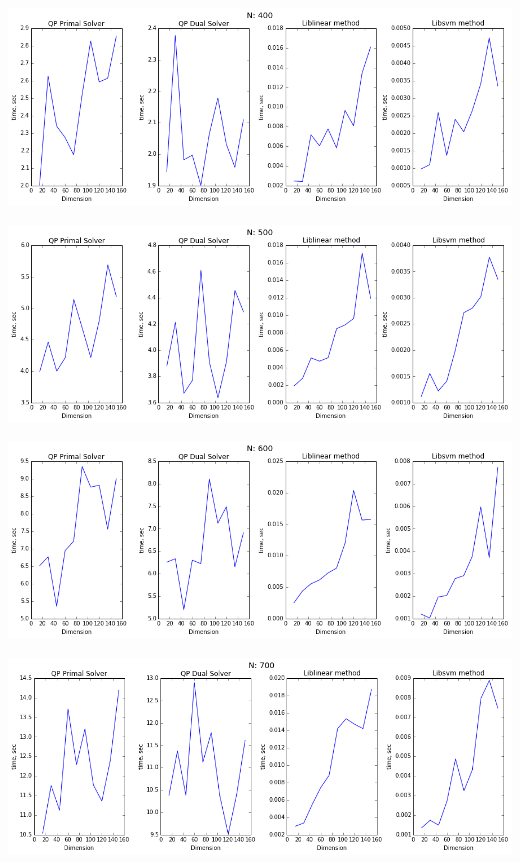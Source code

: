 \documentclass[12pt, a4paper]{article}
\begin{document}
			\begin{center}
				\includegraphics[width=18cm]{1par_N400.png}
			\end{center}

			\begin{center}
				\includegraphics[width=18cm]{1par_N500.png}
			\end{center}

			\begin{center}
				\includegraphics[width=18cm]{1par_N600.png}
			\end{center}

			\begin{center}
				\includegraphics[width=18cm]{1par_N700.png}
			\end{center}
\end{document}
